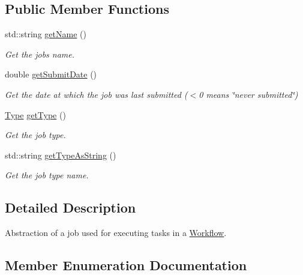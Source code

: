 \subsection*{Public Member Functions}
\begin{DoxyCompactItemize}
\item 
std\+::string \hyperlink{classwrench_1_1_workflow_job_a567b35eaf3952997a71eeedd97138794}{get\+Name} ()
\begin{DoxyCompactList}\small\item\em Get the job\textquotesingle{}s name. \end{DoxyCompactList}\item 
double \hyperlink{classwrench_1_1_workflow_job_a05f015d4d97263662bf2d6d617611a34}{get\+Submit\+Date} ()
\begin{DoxyCompactList}\small\item\em Get the date at which the job was last submitted ($<$0 means \char`\"{}never submitted\char`\"{}) \end{DoxyCompactList}\item 
\hyperlink{classwrench_1_1_workflow_job_a5dcf81c50b5d221ef2a48126bf45d08b}{Type} \hyperlink{classwrench_1_1_workflow_job_a1883671a4e72877bb7fcb0ce771fdc7e}{get\+Type} ()
\begin{DoxyCompactList}\small\item\em Get the job type. \end{DoxyCompactList}\item 
std\+::string \hyperlink{classwrench_1_1_workflow_job_a8162ab7d79c56373d610f8cb7b3f1f07}{get\+Type\+As\+String} ()
\begin{DoxyCompactList}\small\item\em Get the job type name. \end{DoxyCompactList}\end{DoxyCompactItemize}


\subsection{Detailed Description}
Abstraction of a job used for executing tasks in a \hyperlink{classwrench_1_1_workflow}{Workflow}. 

\subsection{Member Enumeration Documentation}
\mbox{\label{classwrench_1_1_workflow_job_a5dcf81c50b5d221ef2a48126bf45d08b}} 
